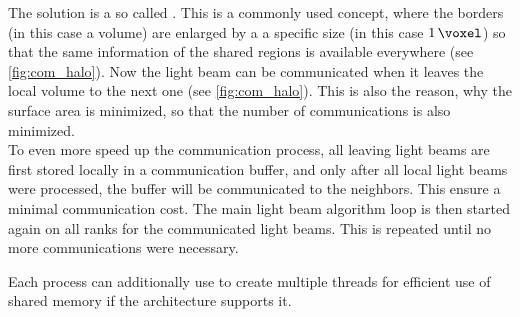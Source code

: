 The solution is a so called .
This is a commonly used concept, where the borders (in this case a volume) are enlarged by a a specific size (in this case $\SI{1}{\voxel}$) so that the same information of the shared regions is available everywhere (see \cref{fig:com_halo}).
% 
Now the light beam can be communicated when it leaves the local volume to the next one (see \cref{fig:com_halo}).
This is also the reason, why the surface area is minimized, so that the number of communications is also minimized.
\\
To even more speed up the communication process, all leaving light beams are first stored locally in a communication buffer, and only after all local light beams were processed, the buffer will be communicated to the neighbors.
This ensure a minimal communication cost.
The main light beam algorithm loop is then started again on all \mpi{} ranks for the communicated light beams.
This is repeated until no more communications were necessary.
\par
% 
Each \mpi{} process can additionally use \openmp{} to create multiple threads for efficient use of shared memory if the architecture supports it.
% 